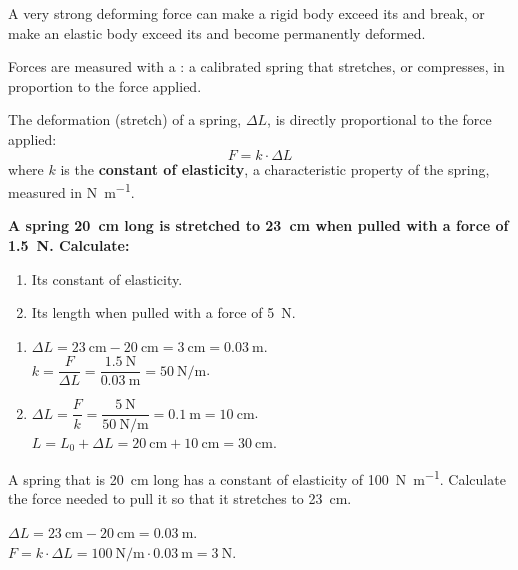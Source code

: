 \begin{impt}
    A very strong deforming force can make a rigid body exceed its  and break, or make an elastic body exceed its  and become permanently deformed.
\end{impt}

Forces are measured with a : a calibrated spring that stretches, or compresses, in proportion to the force applied.

\begin{definition}
    The deformation (stretch) of a spring, \(\Delta L\), is directly proportional to the force applied:
    \begin{equation*}
        F = k \cdot \Delta L
    \end{equation*}
    where \(k\) is the \textbf{constant of elasticity}, a characteristic property of the spring, measured in \unit{\newton\per\metre}.
\end{definition}

\begin{example}
    \textbf{A spring \qty{20}{\cm} long is stretched to \qty{23}{\cm} when pulled with a force of \qty{1.5}{\newton}. Calculate:}
    \begin{enumerate}[label=\letraminuscula]
        \item Its constant of elasticity.
        \item Its length when pulled with a force of \qty{5}{\newton}.
    \end{enumerate}
    \begin{enumerate}[label=\alph*)]
        \item \(\Delta L = \qty{23}{\cm} - \qty{20}{\cm} = \qty{3}{\cm} = \qty{0.03}{\m}\). \\
        \(k = \dfrac{F}{\Delta L} = \dfrac{\qty{1.5}{\newton}}{\qty{0.03}{\m}} = \qty{50}{\newton\per\metre}\).
        \item \(\Delta L = \dfrac{F}{k} = \dfrac{\qty{5}{\newton}}{\qty{50}{\newton\per\metre}} = \qty{0.1}{\m} = \qty{10}{\cm}\). \\
        \(L = L_0 + \Delta L = \qty{20}{\cm} + \qty{10}{\cm} = \qty{30}{\cm}\).
    \end{enumerate}
\end{example}

\begin{exercise}
    A spring that is \qty{20}{\cm} long has a constant of elasticity of \qty{100}{\newton\per\metre}. Calculate the force needed to pull it so that it stretches to \qty{23}{\cm}.
    \begin{solu}
        \(\Delta L = \qty{23}{\cm} - \qty{20}{\cm} = \qty{0.03}{\m}\). \\
        \(F = k \cdot \Delta L = \qty{100}{\newton\per\metre} \cdot \qty{0.03}{\m} = \qty{3}{\newton}\).
    \end{solu}
\end{exercise}

